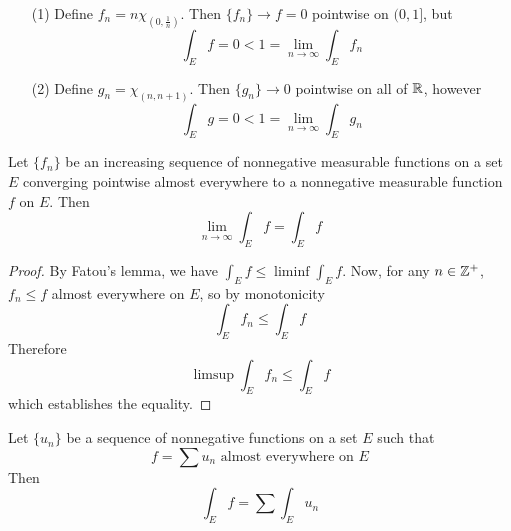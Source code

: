 \begin{example}\label{example_10.4}
    \begin{enumerate}
        \item[(1)] Define $f_n=n\chi_{(0,\frac{1}{n})}$. Then $\{f_n\}
            \xrightarrow{} f=0$ pointwise on $(0,1]$, but
            \begin{equation*}
                \int_E{f}=0<1=\lim_{n \xrightarrow{} \infty}{\int_E{f_n}}
            \end{equation*}

        \item[(2)] Define $g_n=\chi_{(n,n+1)}$. Then $\{g_n\} \xrightarrow{} 0$
            pointwise on all of $\mathbb{R}$, however
            \begin{equation*}
                \int_E{g}=0<1=\lim_{n \xrightarrow{} \infty}{\int_E{g_n}}
            \end{equation*}
    \end{enumerate}
\end{example}

\begin{theorem}\label{10.2.7}
    Let $\{f_n\}$ be an increasing sequence of nonnegative measurable functions
    on a set $E$ converging pointwise almost everywhere to a nonnegative
    measurable function $f$ on  $E$. Then
    \begin{equation*}
        \lim_{n \xrightarrow{} \infty}\int_E{f}=\int_E{f}
    \end{equation*}
\end{theorem}
\begin{proof}
    By Fatou's lemma, we have $\int_E{f} \leq \liminf{\int_E{f}}$. Now, for any
    $n \in \mathbb{Z}^+$,  $f_n \leq f$ almost everywhere on  $E$, so by monotonicity
    \begin{equation*}
        \int_E{f_n} \leq \int_E{f}
    \end{equation*}
    Therefore
    \begin{equation*}
        \limsup{\int_E{f_n}} \leq \int_E{f}
    \end{equation*}
    which establishes the equality.
\end{proof}
\begin{corollary}
    Let $\{u_n\}$ be a sequence of nonnegative functions on a set $E$ such that
    \begin{equation*}
        f=\sum{u_n} \text{ almost everywhere on } E
    \end{equation*}
    Then
    \begin{equation*}
        \int_E{f}=\sum{\int_E{u_n}}
    \end{equation*}
\end{corollary}

